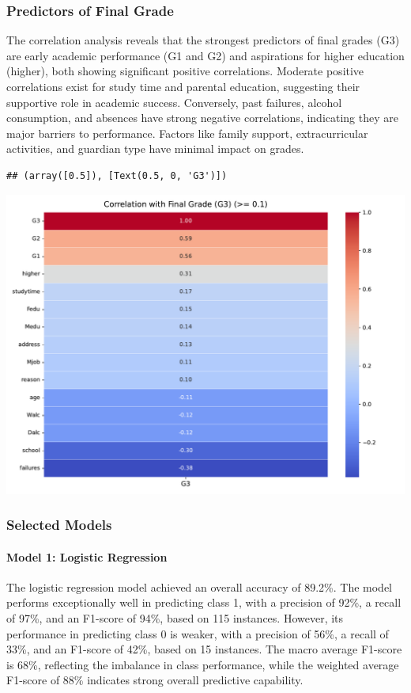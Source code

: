 \documentclass[preprint, 3p,
authoryear]{elsarticle} %
\begin{document}
\subsubsection{Predictors of Final
Grade}\label{predictors-of-final-grade}

The correlation analysis reveals that the strongest predictors of final
grades (G3) are early academic performance (G1 and G2) and aspirations
for higher education (higher), both showing significant positive
correlations. Moderate positive correlations exist for study time and
parental education, suggesting their supportive role in academic
success. Conversely, past failures, alcohol consumption, and absences
have strong negative correlations, indicating they are major barriers to
performance. Factors like family support, extracurricular activities,
and guardian type have minimal impact on grades.

\begin{verbatim}
## (array([0.5]), [Text(0.5, 0, 'G3')])
\end{verbatim}

\begin{center}\includegraphics[width=0.7\linewidth]{Final-Report_files/figure-latex/unnamed-chunk-12-11} \end{center}

\subsubsection{Selected Models}\label{selected-models}

\paragraph{Model 1: Logistic
Regression}\label{model-1-logistic-regression}

\hfill\break
The logistic regression model achieved an overall accuracy of 89.2\%.
The model performs exceptionally well in predicting class 1, with a
precision of 92\%, a recall of 97\%, and an F1-score of 94\%, based on
115 instances. However, its performance in predicting class 0 is weaker,
with a precision of 56\%, a recall of 33\%, and an F1-score of 42\%,
based on 15 instances. The macro average F1-score is 68\%, reflecting
the imbalance in class performance, while the weighted average F1-score
of 88\% indicates strong overall predictive capability.
\end{document}
